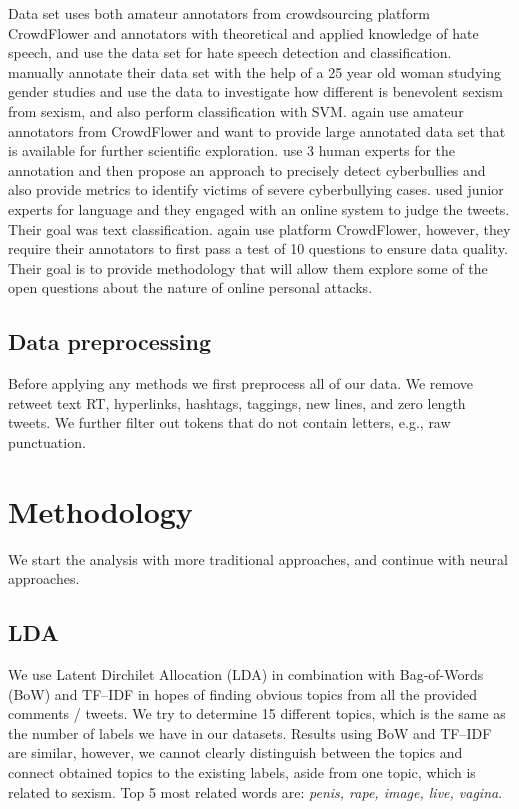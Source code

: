 \documentclass[fleqn,moreauthors,10pt]{ds_report}
\begin{document}
Data set \cite{waseem2016you} uses both amateur annotators from crowdsourcing platform CrowdFlower and annotators with theoretical and applied knowledge of hate speech, and use the data set for hate speech detection and classification. \cite{jha2017does} manually annotate their data set with the help of a 25 year old woman studying gender studies and use the data to investigate how different is benevolent sexism from sexism, and also perform classification with SVM. \cite{founta2018large} again use amateur annotators from CrowdFlower and want to provide large annotated data set that is available for further scientific exploration. \cite{bretschneider2016detecting} use 3 human experts for the annotation and then propose an approach to precisely detect cyberbullies and also provide metrics to identify victims of severe cyberbullying cases. \cite{mandl2019overview} used junior experts for language and they engaged with an online system to judge the tweets. Their goal was text classification. \cite{dixon2017ex} again use platform CrowdFlower, however, they require their annotators to first pass a test of 10 questions to ensure data quality. Their goal is to provide methodology that will allow them explore some of the open questions about the nature of online personal attacks.

\subsection{Data preprocessing}
Before applying any methods we first preprocess all of our data. We remove retweet text RT, hyperlinks, hashtags, taggings, new lines, and zero length tweets. We further filter out tokens that do not contain letters, e.g., raw punctuation.

\section{Methodology}
\label{sec:metho}
We start the analysis with more traditional approaches, and continue with neural approaches.

\subsection*{LDA}
We use Latent Dirchilet Allocation (LDA) in combination with Bag-of-Words (BoW) and TF--IDF in hopes of finding obvious topics from all the provided comments / tweets. We try to determine 15 different topics, which is the same as the number of labels we have in our datasets. Results using BoW and TF--IDF are similar, however, we cannot clearly distinguish between the topics and connect obtained topics to the existing labels, aside from one topic, which is related to sexism. Top 5 most related words are: \textit{penis, rape, image, live, vagina}.
\end{document}
